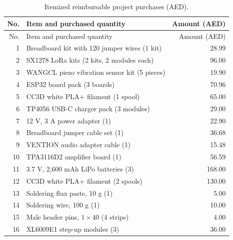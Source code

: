 \section{}
\label{sec:Budget}

\begingroup
\color{black}
\small
\setlength{\tabcolsep}{4pt}
\renewcommand{\arraystretch}{1.15}
\begin{longtable}{r p{} r}
\caption{Itemized reimbursable project purchases (AED).}\label{tab:bom}\\
\toprule
No. & Item and purchased quantity & Amount (AED) \\
\midrule
\endfirsthead
\toprule
No. & Item and purchased quantity & Amount (AED) \\
\midrule
\endhead
1 & Breadboard kit with 120 jumper wires (1 kit) & 28.99 \\
2 & SX1278 LoRa kits (2 kits, 2 modules each) & 96.00 \\
3 & WANGCL piezo vibration sensor kit (5 pieces) & 19.90 \\
4 & ESP32 board pack (3 boards) & 70.96 \\
5 & CC3D white PLA+ filament (1 spool) & 65.00 \\
6 & TP4056 USB-C charger pack (3 modules) & 29.00 \\
7 & 12 V, 3 A power adapter (1) & 22.90 \\
8 & Breadboard jumper cable set (1) & 36.68 \\
9 & VENTION audio adapter cable (1) & 15.48 \\
10 & TPA3116D2 amplifier board (1) & 56.59 \\
11 & 3.7 V, 2,600 mAh LiPo batteries (3) & 168.00 \\
12 & CC3D white PLA+ filament (2 spools) & 130.00 \\
13 & Soldering flux paste, 10 g (1) & 5.00 \\
14 & Soldering wire, 100 g (1) & 10.00 \\
15 & Male header pins, $1\times40$ (4 strips) & 4.00 \\
16 & XL6009E1 step-up modules (3) & 36.00 \\

\end{longtable}
